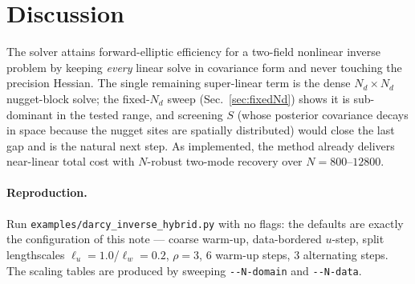 \documentclass[11pt]{article}
\begin{document}
\section{Discussion}\label{sec:discussion}

The solver attains forward-elliptic efficiency for a two-field nonlinear inverse
problem by keeping \emph{every} linear solve in covariance form and never
touching the precision Hessian. The single remaining super-linear term is the
dense $N_d\times N_d$ nugget-block solve; the fixed-$N_d$ sweep
(Sec.~\ref{sec:fixedNd}) shows it is sub-dominant in the tested range, and
screening $S$ (whose posterior covariance decays in space because the nugget
sites are spatially distributed) would close the last gap and is the natural next
step. As implemented, the method already delivers near-linear total cost with
$N$-robust two-mode recovery over $N=800$--$12800$.

\paragraph{Reproduction.} Run \texttt{examples/darcy\_inverse\_hybrid.py}
with no flags: the defaults are exactly the configuration of this note ---
coarse warm-up, data-bordered $u$-step, split lengthscales
$\ell_u=1.0$/$\ell_w=0.2$, $\rho=3$, $6$ warm-up steps, $3$ alternating
steps. The scaling tables are produced by sweeping \texttt{-{}-N-domain}
and \texttt{-{}-N-data}.
\end{document}
